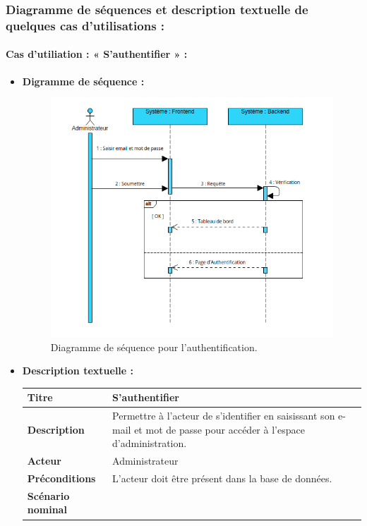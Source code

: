 \documentclass[a4paper, 12pt]{report}
\begin{document}
\subsubsection{Diagramme de séquences et description textuelle de quelques cas d'utilisations :}
\paragraph{Cas d'utiliation : « S'authentifier » :}
\begin{itemize}
    \item \textbf{Digramme de séquence :}
    \begin{figure}[H]
    \centering
    \includegraphics[width = 1\linewidth]{img/sequence1.png}
    \caption{Diagramme de séquence pour l'authentification.}
\end{figure}
\item \textbf{Description textuelle :}
    
\begin{table}[H]
\begin{tabular}{|p{4cm}|p{8cm}|} 
\hline  
\raggedright \textbf{Titre} & S'authentifier   \tabularnewline  
\hline
\raggedright \textbf{Description}  & Permettre à l’acteur de s’identifier en saisissant son e-mail et mot de passe pour accéder à l'espace d'administration.  \tabularnewline  
\hline  
\raggedright \textbf{Acteur}  &  Administrateur \tabularnewline 
\hline
\raggedright \textbf{Préconditions}  &  L’acteur doit être présent dans la base de données. \tabularnewline
\hline
\raggedright \textbf{Scénario nominal}  & 


\end{tabular}
\end{table}
\end{itemize}
\end{document}

